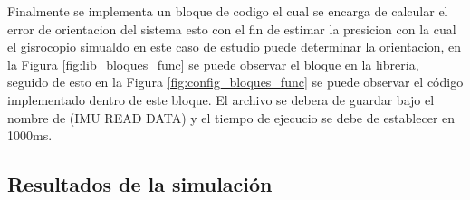 Finalmente se implementa un bloque de codigo el cual se encarga de calcular el error de orientacion del sistema esto con el fin de estimar la presicion con la cual el gisrocopio simualdo en este caso de estudio puede determinar la orientacion, en la Figura \ref{fig:lib_bloques_func} se puede observar el bloque en la libreria, seguido de esto en la Figura \ref{fig:config_bloques_func} se puede observar el código implementado dentro de este bloque. El archivo se debera de guardar bajo el nombre de (IMU READ DATA) y el tiempo de ejecucio se debe de establecer en 1000ms. 

\subsection{Resultados de la simulación}\label{subsub:resultados_simulados_IMU}

